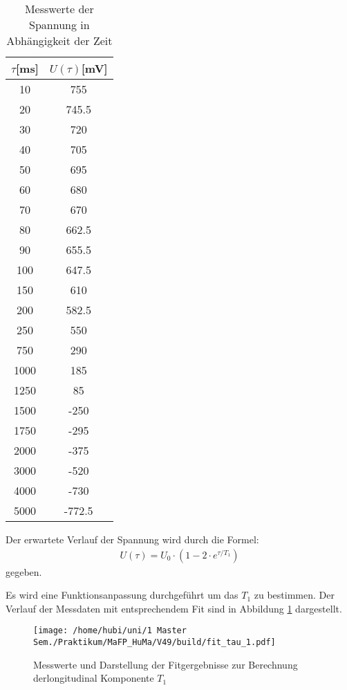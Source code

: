 \begin{table}
  \centering
  \caption{Messwerte der Spannung in Abhängigkeit der Zeit}
  \label{tabmess1}
  \begin{tabular}{c|c}
    \toprule
    $\tau$[ms] & $U(\tau)$[mV]\\
    \midrule
    10 & 755 \\
    20 & 745.5\\
    30 & 720\\
    40 & 705\\
    50 & 695\\
    60 & 680\\
    70 & 670\\
    80 & 662.5\\
    90 & 655.5\\
    100& 647.5\\
    150& 610\\
    200& 582.5\\
    250& 550\\
    750& 290\\
    1000& 185\\
    1250& 85\\
    1500& -250\\
    1750& -295\\
    2000& -375\\
    3000& -520\\
    4000& -730\\
    5000& -772.5\\
    \bottomrule
  \end{tabular}
\end{table}

Der erwartete Verlauf der Spannung wird durch die Formel:
\begin{align}
    \label{fidformel}
    U(\tau)=U_0 \cdot (1-2\cdot e^{\tau/T_1})
\end{align}
gegeben.

Es wird eine Funktionsanpassung durchgeführt um das $T_1$ zu bestimmen.
Der Verlauf der Messdaten mit entsprechendem Fit sind in Abbildung \ref{t1fit}
dargestellt.


\begin{figure}
\centering
\texttt{[image: /home/hubi/uni/1 Master Sem./Praktikum/MaFP\_HuMa/V49/build/fit\_tau\_1.pdf]}
\caption{Messwerte und Darstellung der Fitgergebnisse zur Berechnung
derlongitudinal Komponente $T_1$}
\label{t1fit}
\end{figure}


